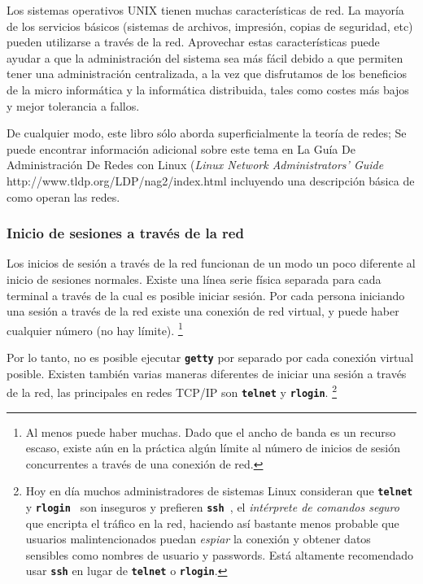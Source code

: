 \documentclass[12pt]{article}
\begin{document}
\begin{}
 Los sistemas operativos UNIX tienen muchas características de red. La
mayoría de los servicios básicos (sistemas de archivos, impresión, copias de
seguridad, etc) pueden utilizarse a través de la red. Aprovechar estas
características puede ayudar a que la administración del sistema sea más fácil
debido a que permiten tener una administración centralizada, a la vez que
disfrutamos de los beneficios de la micro informática y la informática
distribuida, tales como costes más bajos y mejor tolerancia a fallos.  

 De cualquier modo, este libro sólo aborda superficialmente la teoría de
redes; Se puede encontrar información adicional sobre este tema en La Guía De
Administración De Redes con  Linux (\textit{Linux Network Administrators' Guide}
	http://www.tldp.org/LDP/nag2/index.html
incluyendo una descripción básica de como
operan las redes.  



\subsubsection{ Inicio de sesiones a través de la red}

 Los inicios de sesión a través de la red funcionan de un modo un poco
diferente al inicio de sesiones normales. Existe una línea serie física separada
para cada terminal a través de la cual es posible iniciar sesión. Por cada
persona iniciando una sesión a través de la red existe una conexión de red
virtual, y puede haber cualquier número (no hay límite).  
\footnote{Al menos puede haber muchas. Dado que el ancho de banda es un
recurso escaso, existe aún en la práctica algún límite al
número de inicios de sesión concurrentes a través de una conexión
de red. }

Por lo tanto, no es
posible ejecutar \texttt{\textbf{getty}} por separado por cada conexión virtual posible. Existen
también varias maneras diferentes de iniciar una sesión a través de la red, las
principales en redes TCP/IP son \texttt{\textbf{telnet}} y \texttt{\textbf{rlogin}}.
\footnote{Hoy en día muchos administradores de sistemas Linux consideran
que \texttt{\textbf{telnet}} y \texttt{\textbf{rlogin }} son inseguros y
prefieren \texttt{\textbf{ssh }}, el \textit{intérprete de comandos
seguro} que 			encripta el tráfico en la red, haciendo
así bastante menos probable que usuarios malintencionados puedan
\textit{espiar} la 				conexión y obtener datos
sensibles como nombres de usuario y 				passwords. Está
altamente recomendado usar \texttt{\textbf{ssh}} 			en lugar
de \texttt{\textbf{telnet}} o \texttt{\textbf{rlogin}}.  }



\end{}
\end{document}
